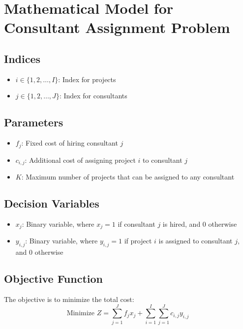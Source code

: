 \documentclass{article}
\begin{document}
\section*{Mathematical Model for Consultant Assignment Problem}

\subsection*{Indices}
\begin{itemize}
    \item \(i \in \{1, 2, \ldots, I\}\): Index for projects
    \item \(j \in \{1, 2, \ldots, J\}\): Index for consultants
\end{itemize}

\subsection*{Parameters}
\begin{itemize}
    \item \(f_j\): Fixed cost of hiring consultant \(j\)
    \item \(c_{i,j}\): Additional cost of assigning project \(i\) to consultant \(j\)
    \item \(K\): Maximum number of projects that can be assigned to any consultant
\end{itemize}

\subsection*{Decision Variables}
\begin{itemize}
    \item \(x_{j}\): Binary variable, where \(x_{j} = 1\) if consultant \(j\) is hired, and \(0\) otherwise
    \item \(y_{i,j}\): Binary variable, where \(y_{i,j} = 1\) if project \(i\) is assigned to consultant \(j\), and \(0\) otherwise
\end{itemize}

\subsection*{Objective Function}
The objective is to minimize the total cost:
\[
\text{Minimize } Z = \sum_{j=1}^{J} f_j x_j + \sum_{i=1}^{I} \sum_{j=1}^{J} c_{i,j} y_{i,j}
\]
\end{document}
